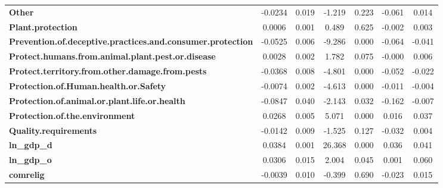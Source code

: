 \begin{center}
\begin{tabular}{lcccccc}
\textbf{Other}                                                     &      -0.0234  &        0.019     &    -1.219  &         0.223        &       -0.061    &        0.014     \\
\textbf{Plant.protection}                                          &       0.0006  &        0.001     &     0.489  &         0.625        &       -0.002    &        0.003     \\
\textbf{Prevention.of.deceptive.practices.and.consumer.protection} &      -0.0525  &        0.006     &    -9.286  &         0.000        &       -0.064    &       -0.041     \\
\textbf{Protect.humans.from.animal.plant.pest.or.disease}          &       0.0028  &        0.002     &     1.782  &         0.075        &       -0.000    &        0.006     \\
\textbf{Protect.territory.from.other.damage.from.pests}            &      -0.0368  &        0.008     &    -4.801  &         0.000        &       -0.052    &       -0.022     \\
\textbf{Protection.of.Human.health.or.Safety}                      &      -0.0074  &        0.002     &    -4.613  &         0.000        &       -0.011    &       -0.004     \\
\textbf{Protection.of.animal.or.plant.life.or.health}              &      -0.0847  &        0.040     &    -2.143  &         0.032        &       -0.162    &       -0.007     \\
\textbf{Protection.of.the.environment}                             &       0.0268  &        0.005     &     5.071  &         0.000        &        0.016    &        0.037     \\
\textbf{Quality.requirements}                                      &      -0.0142  &        0.009     &    -1.525  &         0.127        &       -0.032    &        0.004     \\
\textbf{ln\_gdp\_d}                                                &       0.0384  &        0.001     &    26.368  &         0.000        &        0.036    &        0.041     \\
\textbf{ln\_gdp\_o}                                                &       0.0306  &        0.015     &     2.004  &         0.045        &        0.001    &        0.060     \\
\textbf{comrelig}                                                  &      -0.0039  &        0.010     &    -0.399  &         0.690        &       -0.023    &        0.015     \\

\end{tabular}
\end{center}
